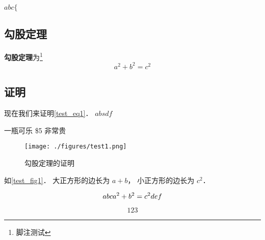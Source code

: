 
$abc\{$
\subsection{勾股定理}
\textbf{勾股定理}为\footnote{脚注测试}
\begin{equation}\label{test_eq1}
a^2 + b^2 = c^2
\end{equation}

\subsection{证明}
现在我们来证明\autoref{test_eq1}． $absdf$

一瓶可乐 \$5 非常贵

\begin{figure}[ht]
\centering
\texttt{[image: ./figures/test1.png]}
\caption{勾股定理的证明} \label{test_fig1}
\end{figure}

如\autoref{test_fig1}． 大正方形的边长为 $a + b$， 小正方形的边长为 $c^2$． 

\begin{equation}
abc\\
a^2 + b^2 = c^2\\
def
\end{equation}

\begin{equation}
123
\end{equation}
